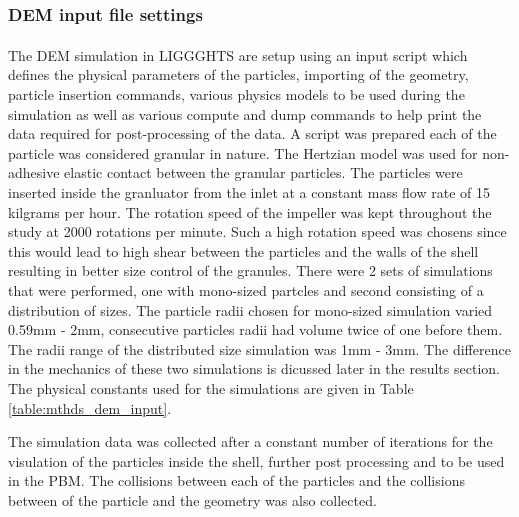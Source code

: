 \documentclass[preprint,11pt,authoryear]{elsarticle}
\begin{document}
	    \subsubsection{DEM input file settings}
	    \par The DEM simulation in LIGGGHTS\textsuperscript{\textregistered} are setup using an input script which defines the physical parameters of the particles, importing of the geometry, particle insertion commands, various physics models to be used during the simulation as well as various compute and dump commands to help print the data required for post-processing of the data. A script was prepared each of the particle was considered granular in nature. The Hertzian model was used for non-adhesive elastic contact between the granular particles. The particles were inserted inside the granluator from the inlet at a constant mass flow rate of 15 kilgrams per hour. The rotation speed of the impeller was kept throughout the study at 2000 rotations per minute. Such a high rotation speed was chosens since this would lead to high shear between the particles and the walls of the shell resulting in better size control of the granules. There were 2 sets of simulations that were performed, one with mono-sized partcles and second consisting of a distribution of sizes. The particle radii chosen for mono-sized simulation varied 0.59mm - 2mm, consecutive particles radii had volume twice of one before them. The radii range of the distributed size simulation was 1mm - 3mm. The difference in the mechanics of these two simulations is dicussed later in the results section. The physical constants used for the simulations are given in Table \ref{table:mthds_dem_input}.
	    \par The simulation data was collected after a constant number of iterations for the visulation of the particles inside the shell, further post processing and to be used in the PBM. The collisions between each of the particles and the collisions between of the particle and the geometry was also collected. 
\end{document}
